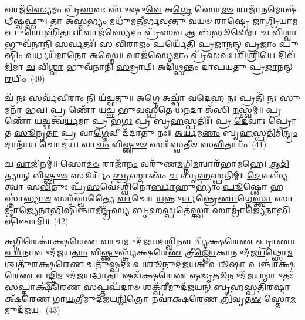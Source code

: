 {\anuvakamend[{\-\ul{𑌅}\-\-\ul{𑌪𑌾}\-𑌨𑍋 𑌵𑌾𑌜𑌾᳴\-\ul{𑌯} 𑌨𑌵᳴ 𑌚}]}%

𑌵𑌾𑌜᳴\-\ul{𑌸𑍍𑌯𑍇}\-𑌮𑌂 𑌪𑍍𑌰᳴\-\ul{𑌸}\-𑌵𑌃 𑌸𑍁᳴𑌷𑍁\-\ul{𑌵𑍇} 𑌅\-\ul{𑌗𑍍𑌰𑍇} 𑌸𑍋\-\ul{𑌮}\-\-\ul{𑍞} 𑌰𑌾𑌜𑌾᳴\-\ul{𑌨}\-𑌮𑍋𑌷᳴𑌧𑍀\-\ul{𑌷𑍍𑌵}\-𑌫𑍍𑌸𑍁। 𑌤𑌾 \ul{𑌅}\-𑌸𑍍𑌮\-\ul{𑌭𑍍𑌯𑌂} 𑌮𑌧𑍁᳴𑌮𑌤𑍀𑌰𑍍𑌭𑌵𑌨𑍍𑌤𑍁 \ul{𑌵}\-𑌯𑍞 \ul{𑌰𑌾}\-𑌷𑍍𑌟𑍍𑌰𑍇 𑌜𑌾॑𑌗𑍍𑌰𑌿𑌯𑌾𑌮 \ul{𑌪𑍁}\-𑌰𑍋𑌹𑌿᳴𑌤𑌾𑌃॥ 𑌵𑌾𑌜᳴\-\ul{𑌸𑍍𑌯𑍇}\-𑌦𑌂 𑌪𑍍𑌰᳴\-\ul{𑌸}\-𑌵 𑌆 𑌬᳴𑌭𑍂\-\ul{𑌵𑍇}\-𑌮𑌾 \ul{𑌚} 𑌵𑌿\-\ul{𑌶𑍍𑌵𑌾} 𑌭𑍁𑌵᳴𑌨𑌾𑌨𑌿 \ul{𑌸}\-𑌰𑍍𑌵𑌤𑌃᳴। 𑌸 \ul{𑌵𑌿}\-𑌰𑌾\-\ul{𑌜𑌂} 𑌪𑌰𑍍𑌯𑍇᳴𑌤𑌿 𑌪𑍍𑌰\-\ul{𑌜𑌾}\-𑌨𑌨𑍍 \ul{𑌪𑍍𑌰}\-𑌜𑌾𑌂 𑌪𑍁𑌷𑍍𑌟𑌿𑌂᳴ \ul{𑌵}\-𑌰𑍍𑌧𑌯᳴𑌮𑌾𑌨𑍋 \ul{𑌅}\-𑌸𑍍𑌮𑍇॥ 𑌵𑌾𑌜᳴\-\ul{𑌸𑍍𑌯𑍇}\-𑌮𑌾𑌂 𑌪𑍍𑌰᳴\-\ul{𑌸}\-𑌵𑌃 𑌶𑌿᳴𑌶𑍍𑌰𑌿\-\ul{𑌯𑍇} 𑌦𑌿𑌵᳴\-\ul{𑌮𑌿}\-𑌮𑌾 \ul{𑌚} 𑌵𑌿\-\ul{𑌶𑍍𑌵𑌾} 𑌭𑍁𑌵᳴𑌨𑌾𑌨𑌿 \ul{𑌸}\-𑌮𑍍𑌰𑌾𑌟𑍍। 𑌅𑌦𑌿᳴𑌥𑍍𑌸𑌨𑍍𑌤𑌂 𑌦𑌾𑌪𑌯𑌤𑍁 𑌪𑍍𑌰\-\ul{𑌜𑌾}\-𑌨𑌨𑍍 \ul{𑌰}\-𑌯𑌿𑌂~(40)

𑌚᳴ \ul{𑌨𑌃} 𑌸𑌰𑍍𑌵᳴𑌵𑍀\-\ul{𑌰𑌾𑌂} 𑌨𑌿 𑌯᳴𑌚𑍍𑌛𑌤𑍁॥ 𑌅\-\ul{𑌗𑍍𑌨𑍇} 𑌅𑌚𑍍𑌛𑌾᳴ 𑌵\-\ul{𑌦𑍇}\-𑌹 \ul{𑌨𑌃} 𑌪𑍍𑌰𑌤𑌿᳴ 𑌨𑌃 \ul{𑌸𑍁}\-𑌮𑌨𑌾᳴ 𑌭𑌵। 𑌪𑍍𑌰 𑌣𑍋᳴ 𑌯𑌚𑍍𑌛 𑌭𑍁𑌵𑌸𑍍𑌪𑌤𑍇 𑌧\-\ul{𑌨}\-𑌦𑌾 𑌅᳴𑌸𑌿 \ul{𑌨}\-𑌸𑍍𑌤𑍍𑌵𑌮𑍍॥ 𑌪𑍍𑌰 𑌣𑍋᳴ 𑌯𑌚𑍍𑌛𑌤𑍍𑌵\-\ul{𑌰𑍍𑌯}\-𑌮𑌾 𑌪𑍍𑌰 𑌭\-\ul{𑌗𑌃} 𑌪𑍍𑌰 𑌬𑍃\-\ul{𑌹}\-𑌸𑍍𑌪𑌤𑌿𑌃᳴। 𑌪𑍍𑌰 \ul{𑌦𑍇}\-𑌵𑌾𑌃 𑌪𑍍𑌰𑍋𑌤 \ul{𑌸𑍂}\-𑌨𑍃\-\ul{𑌤𑌾} 𑌪𑍍𑌰 𑌵𑌾\-\ul{𑌗𑍍𑌦𑍇}\-𑌵𑍀 𑌦᳴𑌦𑌾𑌤𑍁 𑌨𑌃॥ \ul{𑌅}\-\-\ul{𑌰𑍍𑌯}\-𑌮\-\ul{𑌣𑌂} 𑌬𑍃\-\ul{𑌹}\-𑌸𑍍𑌪\-\ul{𑌤𑌿}\-𑌮𑌿\-\ul{𑌨𑍍𑌦𑍍𑌰𑌂} 𑌦𑌾𑌨𑌾᳴𑌯 𑌚𑍋𑌦𑌯। 𑌵𑌾\-\ul{𑌚𑌂} 𑌵𑌿\-\ul{𑌷𑍍𑌣𑍁}\-\-\ul{𑍞} 𑌸𑌰᳴𑌸𑍍𑌵𑌤𑍀𑍞 𑌸\-\ul{𑌵𑌿}\-𑌤𑌾𑌰𑌂᳴~(41)

𑌚 \ul{𑌵𑌾}\-𑌜𑌿𑌨𑌮𑍍॑॥ 𑌸𑍋\-\ul{𑌮}\-\-\ul{𑍞} 𑌰𑌾𑌜𑌾᳴\-\ul{𑌨𑌂} 𑌵𑌰𑍁᳴𑌣\-\ul{𑌮}\-𑌗𑍍𑌨𑌿\-\ul{𑌮}\-𑌨𑍍𑌵𑌾𑌰᳴𑌭𑌾𑌮𑌹𑍇। \ul{𑌆}\-\-\ul{𑌦𑌿}\-𑌤𑍍𑌯𑌾𑌨𑍍 𑌵𑌿\-\ul{𑌷𑍍𑌣𑍁}\-\-\ul{𑍞} 𑌸𑍂𑌰𑍍𑌯𑌂᳴ \ul{𑌬𑍍𑌰}\-𑌹𑍍𑌮𑌾𑌣𑌂᳴ \ul{𑌚} 𑌬𑍃\-\ul{𑌹}\-𑌸𑍍𑌪𑌤𑌿𑌮𑍍॑॥ \ul{𑌦𑍇}\-𑌵𑌸𑍍𑌯᳴ 𑌤𑍍𑌵𑌾 𑌸\-\ul{𑌵𑌿}\-𑌤𑍁𑌃 𑌪𑍍𑌰᳴\-\ul{𑌸}\-𑌵𑍇॑\-𑌽𑌶𑍍𑌵𑌿𑌨𑍋॑\-\ul{𑌰𑍍𑌬𑌾}\-𑌹𑍁\-𑌭𑍍𑌯𑌾𑌂॑ \ul{𑌪𑍂}\-𑌷𑍍𑌣𑍋 𑌹𑌸𑍍𑌤𑌾॑\-\ul{𑌭𑍍𑌯𑌾}\-\-\ul{𑍞} 𑌸𑌰᳴𑌸𑍍𑌵𑌤𑍍𑌯𑍈 \ul{𑌵𑌾}\-𑌚𑍋 \ul{𑌯}\-𑌨𑍍𑌤𑍁\-\ul{𑌰𑍍𑌯}\-𑌨𑍍𑌤𑍍𑌰𑍇\-\ul{𑌣𑌾}\-𑌗𑍍𑌨𑍇\-\ul{𑌸𑍍𑌤𑍍𑌵𑌾} 𑌸𑌾𑌮𑍍𑌰𑌾॑𑌜𑍍𑌯𑍇\-\ul{𑌨𑌾}\-𑌭𑌿𑌷𑌿᳴\-\ul{𑌞𑍍𑌚𑌾}\-𑌮𑍀𑌨𑍍𑌦𑍍𑌰᳴\-\ul{𑌸𑍍𑌯} 𑌬𑍃\-\ul{𑌹}\-𑌸𑍍𑌪𑌤𑍇॑\-\ul{𑌸𑍍𑌤𑍍𑌵𑌾} 𑌸𑌾𑌮𑍍𑌰𑌾॑𑌜𑍍𑌯𑍇\-\ul{𑌨𑌾}\-𑌭𑌿𑌷𑌿᳴𑌞𑍍𑌚𑌾𑌮𑌿॥~(42)

{\anuvakamend[{\-\ul{𑌰}\-𑌯𑌿𑍞 𑌸᳴\-\ul{𑌵𑌿}\-𑌤𑌾\-\ul{𑌰}\-\-\ul{𑍞} 𑌷𑌟𑍍𑌤𑍍𑌰𑌿𑍞᳴𑌶𑌚𑍍𑌚}]}%

\-\ul{𑌅}\-𑌗𑍍𑌨𑌿𑌰𑍇𑌕𑌾॑𑌕𑍍𑌷𑌰𑍇\-\ul{𑌣} 𑌵𑌾\-\ul{𑌚}\-𑌮𑍁𑌦᳴𑌜𑌯\-\ul{𑌦}\-𑌶𑍍𑌵𑌿\-\ul{𑌨𑍗} 𑌦𑍍𑌵𑍍𑌯᳴𑌕𑍍𑌷𑌰𑍇𑌣 𑌪𑍍𑌰𑌾𑌣𑌾\-\-\ul{𑌪𑌾}\-𑌨𑌾\-𑌵𑍁𑌦᳴\-𑌜𑌯\-\ul{𑌤𑌾𑌂} 𑌵𑌿\-\ul{𑌷𑍍𑌣𑍁}\-𑌸𑍍𑌤𑍍𑌰𑍍𑌯᳴𑌕𑍍𑌷𑌰𑍇\-\ul{𑌣} 𑌤𑍍𑌰𑍀\-\ul{𑌲𑍍𑌲𑍋𑌁}\-𑌕𑌾𑌨𑍁𑌦᳴𑌜\-\ul{𑌯}\-𑌥𑍍𑌸𑍋\-\ul{𑌮}\-𑌶𑍍𑌚𑌤𑍁᳴𑌰𑌕𑍍𑌷𑌰𑍇\-\ul{𑌣} 𑌚𑌤𑍁᳴𑌷𑍍𑌪𑌦𑌃 \ul{𑌪}\-𑌶𑍂𑌨𑍁𑌦᳴𑌜𑌯𑌤𑍍 \ul{𑌪𑍂}\-𑌷𑌾 𑌪𑌞𑍍𑌚𑌾॑𑌕𑍍𑌷𑌰𑍇𑌣 \ul{𑌪}\-𑌙𑍍𑌕𑍍𑌤𑌿𑌮𑍁𑌦᳴𑌜𑌯\-\ul{𑌦𑍍𑌧𑌾}\-𑌤𑌾 𑌷𑌡᳴𑌕𑍍𑌷𑌰𑍇\-\ul{𑌣} 𑌷\-\ul{𑌡𑍃}\-𑌤𑍂𑌨𑍁𑌦᳴𑌜𑌯\-\ul{𑌨𑍍𑌮}\-𑌰𑍁𑌤𑌃᳴ \ul{𑌸}\-𑌪𑍍𑌤𑌾𑌕𑍍𑌷᳴𑌰𑍇𑌣 \ul{𑌸}\-𑌪𑍍𑌤𑌪᳴\-\ul{𑌦𑌾}\-\-\ul{𑍞} 𑌶𑌕𑍍𑌵᳴\-\ul{𑌰𑍀}\-𑌮𑍁𑌦᳴𑌜\-\ul{𑌯}\-𑌨𑍍 𑌬𑍃\-\ul{𑌹}\-𑌸𑍍𑌪𑌤𑌿᳴\-\ul{𑌰}\-𑌷𑍍𑌟𑌾𑌕𑍍𑌷᳴𑌰𑍇𑌣 𑌗𑌾\-\ul{𑌯}\-𑌤𑍍𑌰𑍀𑌮𑍁𑌦᳴𑌜𑌯\-\ul{𑌨𑍍𑌮𑌿}\-𑌤𑍍𑌰𑍋 𑌨𑌵𑌾॑𑌕𑍍𑌷𑌰𑍇𑌣 \ul{𑌤𑍍𑌰𑌿}\-𑌵𑍃\-\ul{𑌤}\-\-\ul{𑍟} 𑌸𑍍𑌤𑍋\-\ul{𑌮}\-𑌮𑍁𑌦᳴𑌜\-\ul{𑌯}\--~(43)

